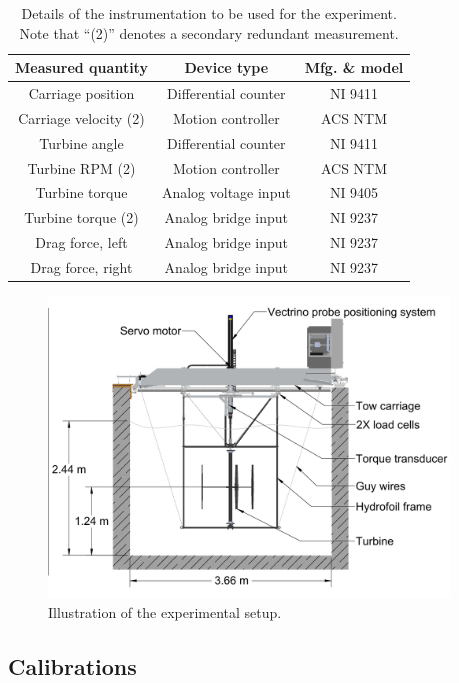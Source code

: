 \documentclass[12pt,letterpaper]{scrreprt}
\begin{document}
\begin{table}[ht]
\centering
\begin{tabular}{c|c|c}
Measured quantity & Device type & Mfg. \& model \\
\hline 
Carriage position & Differential counter & NI 9411 \\
Carriage velocity (2) & Motion controller & ACS NTM \\
Turbine angle & Differential counter & NI 9411 \\
Turbine RPM (2) & Motion controller & ACS NTM \\
Turbine torque & Analog voltage input & NI 9405 \\ 
Turbine torque (2) & Analog bridge input & NI 9237 \\
Drag force, left & Analog bridge input & NI 9237 \\
Drag force, right & Analog bridge input & NI 9237 \\
\end{tabular}
\caption{Details of the instrumentation to be used for the experiment. Note that
``(2)'' denotes a secondary redundant measurement.}
\label{tab-instrumentation}
\end{table}

\begin{figure}[ht]
\centering
\includegraphics[clip,trim=0.01in 0 0 0, width=0.95\textwidth]{Figures/tank_cross_section}
\caption{Illustration of the experimental setup.}
\label{fig-exp_setup}
\end{figure}


\subsection{Calibrations}
\end{document}
